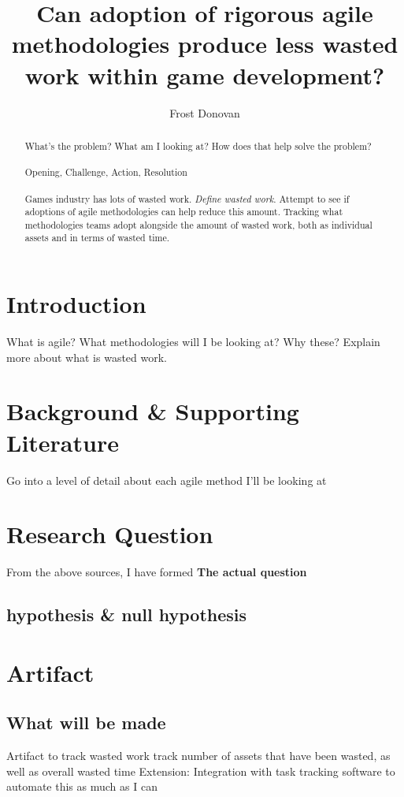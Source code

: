 \documentclass[lettersize,journal]{IEEEtran}
\begin{document}
\title{Can adoption of rigorous agile methodologies produce less wasted work within game development?}

\author{Frost Donovan}

\maketitle

\begin{abstract}
    What's the problem? What am I looking at? How does that help solve the problem? \\
    \\
    Opening, Challenge, Action, Resolution \\
    \\
    Games industry has lots of wasted work. \emph{Define wasted work}. Attempt to see if adoptions of agile methodologies can help reduce this amount. Tracking what methodologies teams adopt alongside the amount of wasted work, both as individual assets and in terms of wasted time.
\end{abstract}

\section{Introduction}
    What is agile? What methodologies will I be looking at? Why these? Explain more about what is wasted work.

\section{Background \& Supporting Literature}
    Go into a level of detail about each agile method I'll be looking at

\section{Research Question}
    From the above sources, I have formed \textbf{The actual question}
    \subsection{hypothesis \& null hypothesis}

\section{Artifact}
    \subsection{What will be made}
        Artifact to track wasted work
        track number of assets that have been wasted, as well as overall wasted time
        Extension: Integration with task tracking software to automate this as much as I can
\end{document}
